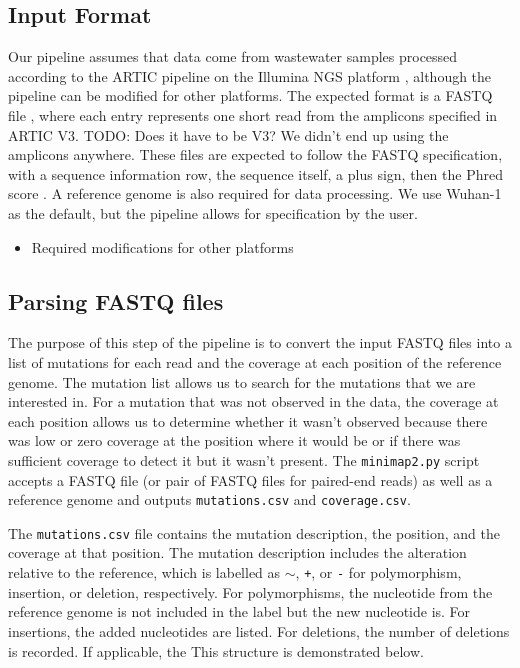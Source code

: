 \documentclass{article}
\newenvironment{tightemize}
{ \begin{itemize}
    \setlength{\itemsep}{0pt}
    \setlength{\parskip}{0pt}
    \setlength{\parsep}{0pt}     }
{ \end{itemize}                  }
\begin{document}
\subsection{Input Format}

Our pipeline assumes that data come from wastewater samples processed according to the ARTIC pipeline \cite{needed} on the Illumina NGS platform \cite{needed}, although the pipeline can be modified for other platforms.
The expected format is a FASTQ file \cite{needed}, where each entry represents one short read from the amplicons specified in ARTIC V3. TODO: Does it have to be V3? We didn't end up using the amplicons anywhere.
These files are expected to follow the FASTQ specification, with a sequence information row, the sequence itself, a plus sign, then the Phred score \cite{needed}.
A reference genome is also required for data processing.
We use Wuhan-1 \cite{needed} as the default, but the pipeline allows for specification by the user.



\begin{tightemize} 
    \item Required modifications for other platforms
\end{tightemize}

\subsection{Parsing FASTQ files}

The purpose of this step of the pipeline is to convert the input FASTQ files into a list of mutations for each read and the coverage at each position of the reference genome.
The mutation list allows us to search for the mutations that we are interested in.
For a mutation that was not observed in the data, the coverage at each position allows us to determine whether it wasn't observed because there was low or zero coverage at the position where it would be or if there was sufficient coverage to detect it but it wasn't present.
The \texttt{minimap2.py} script accepts a FASTQ file (or pair of FASTQ files for paired-end reads) as well as a reference genome and outputs \texttt{mutations.csv} and \texttt{coverage.csv}.

The \texttt{mutations.csv} file contains the mutation description, the position, and the coverage at that position.
The mutation description includes the alteration relative to the reference, which is labelled as \texttt{$\sim$}, \texttt{+}, or \texttt{-} for polymorphism, insertion, or deletion, respectively.
For polymorphisms, the nucleotide from the reference genome is not included in the label but the new nucleotide is.
For insertions, the added nucleotides are listed.
For deletions, the number of deletions is recorded.
If applicable, the 
This structure is demonstrated below.
\end{document}
